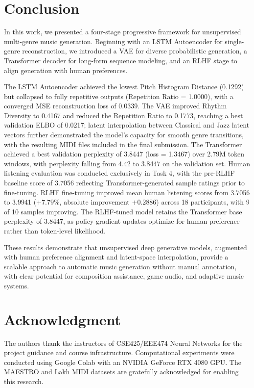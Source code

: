 \documentclass[conference]{IEEEtran}
\begin{document}
\section{Conclusion}
\label{sec:conclusion}

In this work, we presented a four-stage progressive framework for unsupervised
multi-genre music generation. Beginning with an LSTM Autoencoder for
single-genre reconstruction, we introduced a VAE for diverse probabilistic
generation, a Transformer decoder for long-form sequence modeling, and an RLHF
stage to align generation with human preferences.

The LSTM Autoencoder achieved the lowest Pitch Histogram Distance (0.1292) but
collapsed to fully repetitive outputs (Repetition Ratio = 1.0000), with a
converged MSE reconstruction loss of 0.0339. The VAE improved Rhythm Diversity
to 0.4167 and reduced the Repetition Ratio to 0.1773, reaching a best
validation ELBO of 0.0217; latent interpolation between Classical and Jazz
latent vectors further demonstrated the model's capacity for smooth genre
transitions, with the resulting MIDI files included in the final submission.
The Transformer achieved a best validation perplexity of 3.8447 (loss = 1.3467)
over 2.79M token windows, with perplexity falling from 4.42 to 3.8447 on the
validation set. Human listening evaluation was conducted exclusively in Task 4,
with the pre-RLHF baseline score of 3.7056 reflecting Transformer-generated
sample ratings prior to fine-tuning. RLHF fine-tuning improved mean human
listening scores from 3.7056 to 3.9941 ($+7.79\%$, absolute improvement
$+0.2886$) across 18 participants, with 9 of 10 samples improving. The
RLHF-tuned model retains the Transformer base perplexity of 3.8447, as policy
gradient updates optimize for human preference rather than token-level
likelihood.

These results demonstrate that unsupervised deep generative models, augmented
with human preference alignment and latent-space interpolation, provide a
scalable approach to automatic music generation without manual annotation, with
clear potential for composition assistance, game audio, and adaptive music
systems.


\section*{Acknowledgment}

The authors thank the instructors of CSE425/EEE474 Neural Networks for the
project guidance and course infrastructure. Computational experiments were
conducted using Google Colab with an NVIDIA GeForce RTX 4080 GPU.
The MAESTRO and Lakh MIDI datasets are gratefully acknowledged for enabling
this research.




\end{document}
